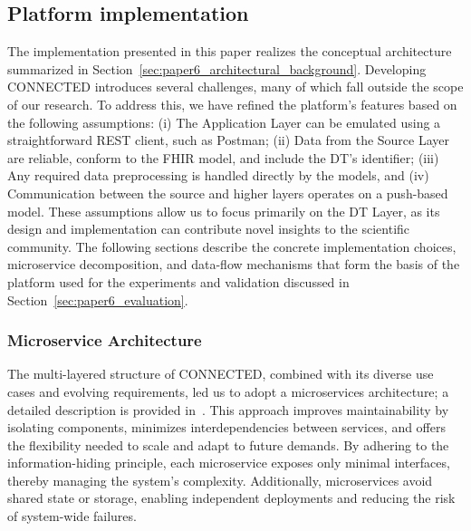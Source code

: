 \subsection{Platform implementation}\label{sec:paper6_implementation}
The implementation presented in this paper realizes the conceptual architecture summarized in Section~\ref{sec:paper6_architectural_background}. 
Developing CONNECTED introduces several challenges, many of which fall outside the scope of our research. To address this, we have refined the platform's features based on the following assumptions: (i) The Application Layer can be emulated using a straightforward REST client, such as Postman; (ii) Data from the Source Layer are reliable, conform to the FHIR model, and include the DT's identifier; (iii) Any required data preprocessing is handled directly by the models, and (iv) Communication between the source and higher layers operates on a push-based model. 
These assumptions allow us to focus primarily on the DT Layer, as its design and implementation can contribute novel insights to the scientific community. The following sections describe the concrete implementation choices, microservice decomposition, and data-flow mechanisms that form the basis of the platform used for the experiments and validation discussed in Section~\ref{sec:paper6_evaluation}.
%
\subsubsection{Microservice Architecture}
The multi-layered structure of CONNECTED, combined with its diverse use cases and evolving requirements, led us to adopt a microservices architecture; a detailed description is provided in~\cite{marfoglia_connected_2025}. This approach improves maintainability by isolating components, minimizes interdependencies between services, and offers the flexibility needed to scale and adapt to future demands. By adhering to the information-hiding principle, each microservice exposes only minimal interfaces, thereby managing the system's complexity. Additionally, microservices avoid shared state or storage, enabling independent deployments and reducing the risk of system-wide failures.

